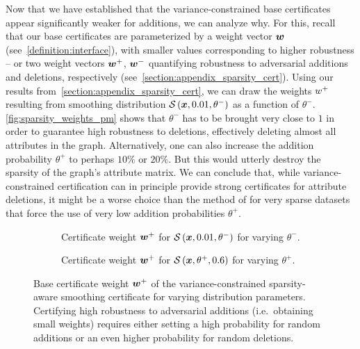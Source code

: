 Now that we have established that the variance-constrained base certificates appear significantly weaker for additions, we can analyze why.
For this, recall that our base certificates are parameterized by a weight vector ${\bm{w}}$ (see~\cref{definition:interface}), with smaller values corresponding to higher robustness -- or two weight vectors ${\bm{w}}^{+}$, ${\bm{w}}^{-}$ quantifying robustness to adversarial additions and deletions, respectively (see~\autoref{section:appendix_sparsity_cert}).
Using our results from~\autoref{section:appendix_sparsity_cert}, we can draw the weights ${w}^{+}$ resulting from smoothing distribution $\mathcal{S}\left({\bm{x}}, 0.01, \theta^{-}\right)$ as a function of $\theta^{-}$.
\autoref{fig:sparsity_weights_pm} shows that $\theta^{-}$ has to be brought very close to $1$ in order to guarantee high robustness to deletions, effectively deleting almost all attributes in the graph.
Alternatively, one can also increase the addition probability $\theta^{+}$ to perhaps $10\%$ or $20\%$. But this would utterly destroy the sparsity of the graph's attribute matrix.
We can conclude that, while variance-constrained certification can in principle provide strong certificates for attribute deletions, it might be a worse choice than the method of \citet{Bojchevski2020} for very sparse datasets that force the use of very low addition probabilities $\theta^{+}$.


\begin{figure}[ht]
    \vskip 0.2in
    \centering
    \begin{subfigure}[b]{0.49\textwidth}
        \resizebox{\textwidth}{!}{}
        \caption{Certificate weight ${\bm{w}}^{+}$ for $\mathcal{S}\left({\bm{x}},0.01,\theta^{-}\right)$ for varying $\theta^{-}$.}
        \label{fig:sparsity_weights_pm}
    \end{subfigure}
    \hfill
    \begin{subfigure}[b]{0.49\textwidth}
        \resizebox{\textwidth}{!}{}
        \caption{Certificate weight ${\bm{w}}^{+}$ for $\mathcal{S}\left({\bm{x}},\theta^{+},0.6\right)$ for varying $\theta^{+}$.}
        \label{fig:sparsity_weights_pp}
    \end{subfigure}
    \caption{
    Base certificate weight ${\bm{w}}^{+}$ of the variance-constrained sparsity-aware smoothing certificate for varying distribution parameters. Certifying high robustness  to adversarial additions (i.e.~obtaining small weights) requires either setting a high probability for random additions or an even higher probability for random deletions.}
    \label{fig:sparsity_weights}
    \vskip -0.2in
\end{figure}



